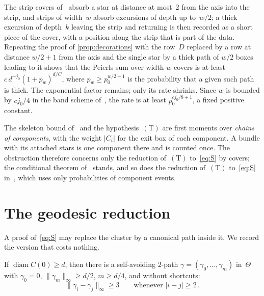 \documentclass[11pt,letterpaper]{article}
\DeclareMathOperator{\diam}{diam}
\begin{document}
\begin{remark}
\label{rem:width}
The strip covers of~\cite{SC26} absorb a star at distance at most~$2$ from the axis into the strip, and strips of width~$w$ absorb excursions of depth up to~$w/2$; a thick excursion of depth~$k$ leaving the strip and returning is then recorded as a short piece of the cover, with a position along the strip that is part of the data. Repeating the proof of \cref{prop:decorations} with the row~$D$ replaced by a row at distance $w/2+1$ from the axis and the single star by a thick path of $w/2$ boxes leading to it shows that the Peierls sum over width-$w$ covers is at least $c\,d^{-j_0}(1+p_w)^{d/C}$, where $p_w\ge p_0^{w/2+1}$ is the probability that a given such path is thick. The exponential factor remains; only its rate shrinks. Since $w$ is bounded by $cj_0/4$ in the band scheme of~\cite{PS26}, the rate is at least $p_0^{cj_0/8+1}$, a fixed positive constant.
\end{remark}

\begin{remark}
\label{rem:chains}
The skeleton bound of~\cite[Section~2]{FM26} and the hypothesis~$\mathrm{(T)}$ are first moments over \emph{chains of components}, with the weight $\lvert C_i\rvert$ for the exit box of each component. A bundle with its attached stars is one component there and is counted once. The obstruction therefore concerns only the reduction of~$\mathrm{(T)}$ to~\eqref{eq:S} by covers; the conditional theorem of~\cite{FM26} stands, and so does the reduction of~$\mathrm{(T)}$ to~\eqref{eq:S} in~\cite[Section~3.1]{FM26}, which uses only probabilities of component events.
\end{remark}

\section{The geodesic reduction}
\label{sec:geodesic}

A proof of~\eqref{eq:S} may replace the cluster by a canonical path inside it. We record the version that costs nothing.

\begin{lemma}
\label{lem:geodesic}
If $\diam C(0)\ge d$, then there is a self-avoiding $2$-path $\gamma=(\gamma_0,\dots,\gamma_m)$ in~$\Theta$ with $\gamma_0=0$, $\lVert\gamma_m\rVert_\infty\ge d/2$, $m\ge d/4$, and without shortcuts:
\begin{equation}
\label{eq:noshortcut}
  \lVert\gamma_i-\gamma_j\rVert_\infty\ge3\qquad\text{whenever }\lvert i-j\rvert\ge2\,.
\end{equation}
\end{lemma}
\end{document}
